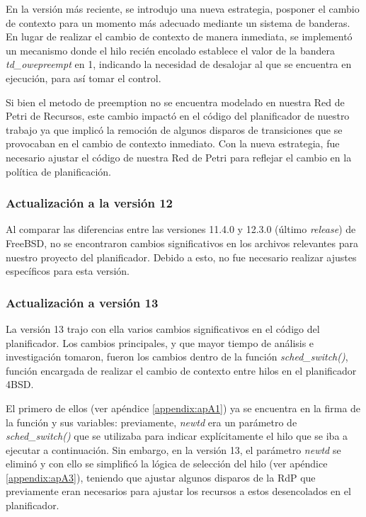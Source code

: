 En la versión más reciente, se introdujo una nueva estrategia, posponer el cambio de contexto para un momento más adecuado mediante un sistema de banderas. En lugar de realizar el cambio de contexto de manera inmediata, se implementó un mecanismo donde el hilo recién encolado establece el valor de la bandera \textit{td\_owepreempt} en 1, indicando la necesidad de desalojar al que se encuentra en ejecución, para así tomar el control.\par

Si bien el metodo de preemption no se encuentra modelado en nuestra Red de Petri de Recursos, este cambio impactó en el código del planificador de nuestro trabajo ya que implicó la remoción de algunos disparos de transiciones que se provocaban en el cambio de contexto inmediato. Con la nueva estrategia, fue necesario ajustar el código de nuestra Red de Petri para reflejar el cambio en la política de planificación.\par

\subsubsection{Actualización a la versión 12}

Al comparar las diferencias entre las versiones 11.4.0 y 12.3.0 (último \textit{release}) de FreeBSD, no se encontraron cambios significativos en los archivos relevantes para nuestro proyecto del planificador. Debido a esto, no fue necesario realizar ajustes específicos para esta versión.


\subsubsection{Actualización a versión 13}

La versión 13 trajo con ella varios cambios significativos en el código del planificador. Los cambios principales, y que mayor tiempo de análisis e investigación tomaron, fueron los cambios dentro de la función \textit{sched\_switch()}, función encargada de realizar el cambio de contexto entre hilos en el planificador 4BSD.\par

El primero de ellos (ver apéndice \ref{appendix:apA1}) ya se encuentra en la firma de la función y sus variables: previamente, \textit{newtd} era un parámetro de \textit{sched\_switch()} que se utilizaba para indicar explícitamente el hilo que se iba a ejecutar a continuación. Sin embargo, en la versión 13, el parámetro \textit{newtd} se eliminó y con ello se simplificó la lógica de selección del hilo (ver apéndice \ref{appendix:apA3}), teniendo que ajustar algunos disparos de la RdP que previamente eran necesarios para ajustar los recursos a estos desencolados en el planificador.\par

